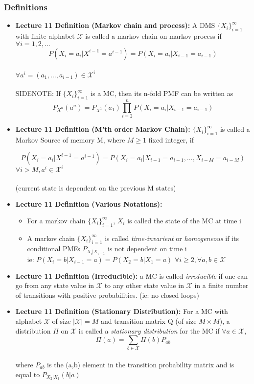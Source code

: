 \documentclass{article}
\begin{document}
\subsubsection{Definitions}
\begin{itemize}
    \item \textbf{Lecture 11 Definition (Markov chain and process):} A DMS \(\{X_i\}_{i=1}^\infty\) with finite alphabet \(\mathcal{X}\) is called a markov chain on markov process if \(\forall i = 1, 2, \ldots\)
    \[P(X_i=a_i | X^{i-1} = a^{i-1}) = P(X_i = a_i | X_{i-1} = a_{i-1})\]
    \\ \(\forall a^i = (a_1, \ldots, a_{i-1}) \in \mathcal{X}^i\)
    \\ \\
    SIDENOTE: If \(\{X_i\}_{i=1}^\infty\) is a MC, then its n-fold PMF can be written as \\
    \[P_{X^n}(a^n) = P_{X^1}(a_1) \prod_{i=2}^n P(X_i=a_i|X_{i-1}=a_{i-1})\]
    
    \item \textbf{Lecture 11 Definition (M'th order Markov Chain):} \(\{X_i\}_{i=1}^\infty\) is called a Markov Source of memory M, where \(M\geq 1\) fixed integer, if
    
    \[P(X_i=a_i|X^{i-1} = a^{i-1}) =P(X_i=a_i|X_{i-1} = a_{i-1}, \ldots, X_{i-M} = a_{i-M})\]
    \(\forall i>M, a^i \in \mathcal{X}^i\)
    \\ \\ (current state is dependent on the previous M states)
    \item \textbf{Lecture 11 Definition (Various Notations):}
    \begin{itemize}
        \item For a markov chain \(\{X_i\}^\infty_{i=1}\), \(X_i\) is called the state of the MC at time i
        \item A markov chain \(\{X_i\}^\infty_{i=1}\) is called \textit{time-invarient} or \textit{homogeneous} if its conditional PMFs \(P_{X_i|X_{i-1}}\) is not dependent on time i
        \\ ie: \(P(X_i = b| X_{i-1} = a) = P(X_2=b|X_1=a)\)  \(\forall i\geq 2, \forall a,b \in \mathcal{X}\)
    \end{itemize}
    \item \textbf{Lecture 11 Definition (Irreducible):} a MC is called \textit{irreducible} if one can go from any state value in \(\mathcal{X}\) to any other state value in \(\mathcal{X}\) in a finite number of transitions with positive probabilities. (ie: no closed loops)
    \item \textbf{Lecture 11 Definition (Stationary Distribution):} For a MC with alphabet \(\mathcal{X}\) of size \(|\mathcal{X}|=M\) and transition matrix Q (of size \(M \times M\)), a distribution \(\Pi\) on \(\mathcal{X}\) is called a \textit{stationary distribution}
    for the MC if \(\forall a \in \mathcal{X},\)
    \[\Pi (a) = \sum_{b \in \mathcal{X}} \Pi(b) P_{ab}\]
    \\ where \(P_{ab}\) is the (a,b) element in the transition probability matrix and is equal to \(P_{X_2|X_1}(b|a)\)

    
\end{itemize}
\end{document}
